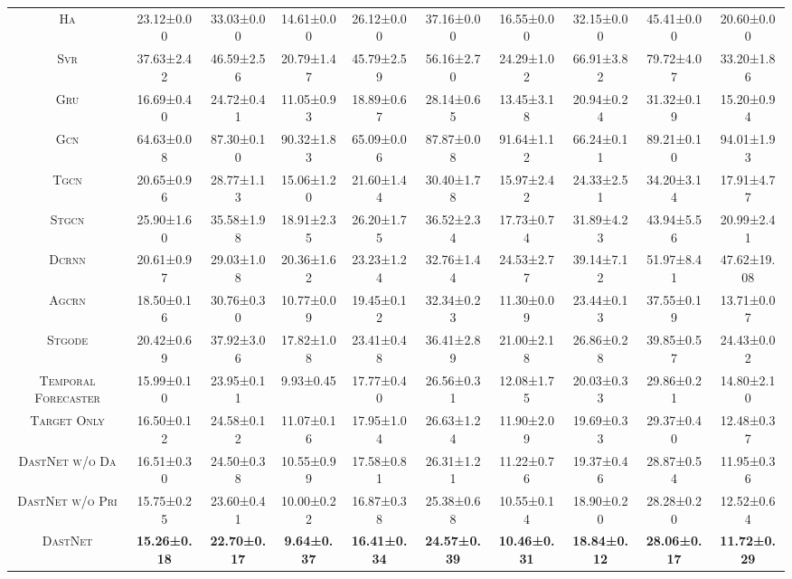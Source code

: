 \documentclass[sigconf]{acmart}
\theoremstyle{definition}
\begin{document}
\begin{table*}[t]
{\begin{tabular}{c||ccc|ccc|ccc}
\textsc{Ha}                     & 23.12±0.00  & 33.03±0.00  & 14.61±0.00  & 26.12±0.00  & 37.16±0.00  & 16.55±0.00  & 32.15±0.00  & 45.41±0.00  & 20.60±0.00 \\
\textsc{Svr}                    & 37.63±2.42  & 46.59±2.56  & 20.79±1.47  & 45.79±2.59  & 56.16±2.70  & 24.29±1.02  & 66.91±3.82  & 79.72±4.07  & 33.20±1.86 \\
\textsc{Gru}                    & 16.69±0.40  & 24.72±0.41  & 11.05±0.93  & 18.89±0.67  & 28.14±0.65  & 13.45±3.18  & 20.94±0.24  & 31.32±0.19  & 15.20±0.94 \\
\textsc{Gcn}                    & 64.63±0.08  & 87.30±0.10  & 90.32±1.83  & 65.09±0.06  & 87.87±0.08  & 91.64±1.12  & 66.24±0.11  & 89.21±0.10  & 94.01±1.93 \\
\textsc{Tgcn}                   & 20.65±0.96  & 28.77±1.13  & 15.06±1.20  & 21.60±1.44  & 30.40±1.78  & 15.97±2.42  & 24.33±2.51  & 34.20±3.14  & 17.91±4.77 \\
\textsc{Stgcn}                  & 25.90±1.60  & 35.58±1.98  & 18.91±2.35  & 26.20±1.75  & 36.52±2.34  & 17.73±0.74  & 31.89±4.23  & 43.94±5.56  & 20.99±2.41 \\
\textsc{Dcrnn}                  & 20.61±0.97  & 29.03±1.08  & 20.36±1.62  & 23.23±1.24  & 32.76±1.44  & 24.53±2.77  & 39.14±7.12  & 51.97±8.41  & 47.62±19.08 \\
\textsc{Agcrn}                  & 18.50±0.16  & 30.76±0.30  & 10.77±0.09  & 19.45±0.12  & 32.34±0.23  & 11.30±0.09  & 23.44±0.13  & 37.55±0.19  & 13.71±0.07 \\
\textsc{Stgode}                 & 20.42±0.69  & 37.92±3.06  & 17.82±1.08  & 23.41±0.48  & 36.41±2.89  & 21.00±2.18  & 26.86±0.28  & 39.85±0.57  & 24.43±0.02 \\
\arrayrulecolor{black!30}\midrule
\textsc{Temporal Forecaster}    & 15.99±0.10  & 23.95±0.11  &  9.93±0.45  & 17.77±0.40  & 26.56±0.31  & 12.08±1.75  & 20.03±0.33  & 29.86±0.21  & 14.80±2.10 \\ 
\textsc{Target Only}            & 16.50±0.12  & 24.58±0.12  & 11.07±0.16  & 17.95±1.04  & 26.63±1.24  & 11.90±2.09  & 19.69±0.33  & 29.37±0.40  & 12.48±0.37 \\
\textsc{DastNet  w/o Da}        & 16.51±0.30  & 24.50±0.38  & 10.55±0.99  & 17.58±0.81  & 26.31±1.21  & 11.22±0.76  & 19.37±0.46  & 28.87±0.54  & 11.95±0.36 \\
\textsc{DastNet  w/o Pri}       & 15.75±0.25  & 23.60±0.41  & 10.00±0.22  & 16.87±0.38  & 25.38±0.68  & 10.55±0.14  & 18.90±0.20  & 28.28±0.20  & 12.52±0.64 \\
\textsc{DastNet}                & \textbf{15.26±0.18}  & \textbf{22.70±0.17}  & \textbf{9.64±0.37}  & \textbf{16.41±0.34}  & \textbf{24.57±0.39}  & \textbf{10.46±0.31}  & \textbf{18.84±0.12}  & \textbf{28.06±0.17}  & \textbf{11.72±0.29} \\ \hline\hline
\end{tabular}
}
\label{table:mainresults}
\end{table*}
\end{document}

